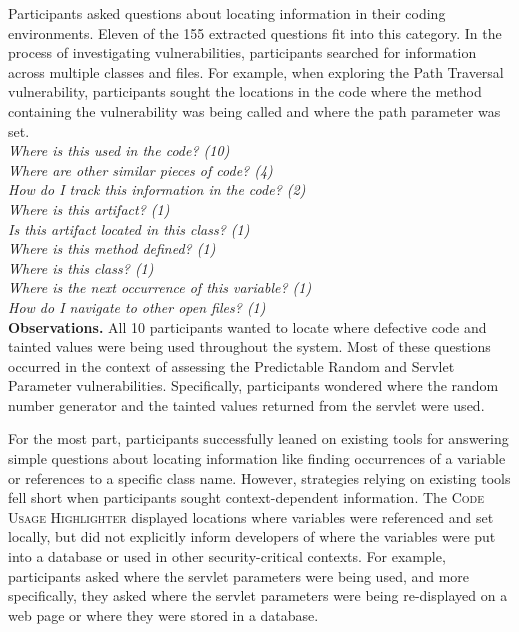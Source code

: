 \documentclass[conference]{IEEEtran}
\begin{document}
Participants asked questions about locating information in their coding environments. 
Eleven of the 155 extracted questions fit into this category.
In the process of investigating vulnerabilities, participants searched for information across multiple classes and files.
For example, when exploring the Path Traversal vulnerability, participants sought the locations in the code where the method containing the vulnerability was being called and where the path parameter was set.
\\

\noindent\emph{Where is this used in the code? (10)} \\
\emph{Where are other similar pieces of code? (4)} \\
\emph{How do I track this information in the code? (2)} \\
\emph{Where is this artifact? (1)} \\
\emph{Is this artifact located in this class? (1)} \\
\emph{Where is this method defined? (1)} \\
\emph{Where is this class? (1)} \\
\emph{Where is the next occurrence of this variable? (1)} \\
\emph{How do I navigate to other open files? (1)} \\


\noindent\textbf{Observations.}
All 10 participants wanted to locate where defective code and tainted values were being used throughout the system. 
Most of these questions occurred in the context of assessing the Predictable Random and Servlet Parameter vulnerabilities.
Specifically, participants wondered where the random number generator and the tainted values returned from the servlet were used.

For the most part, participants successfully leaned on existing tools for answering simple questions about locating information like finding occurrences of a variable or references to a specific class name. 
However, strategies relying on existing tools fell short when participants sought context-dependent information. 
The \textsc{Code Usage Highlighter} displayed locations where variables were referenced and set locally, but did not explicitly inform developers of where the variables were put into a database or used in other security-critical contexts.
For example, participants asked where the servlet parameters were being used, and more specifically, they asked where the servlet parameters were being re-displayed on a web page or where they were stored in a database.
\end{document}
